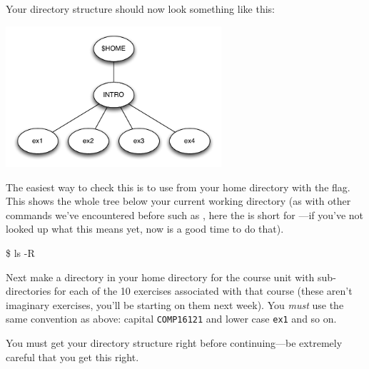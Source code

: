 Your directory structure should now look something like this:
     \begin{center}
       \includegraphics[width=0.6\textwidth]{images/intro-dir-structure}
     \end{center}

The easiest way to check this is to use 
 from your home directory with the  flag. This shows the whole tree
below your current working directory (as with other commands we've encountered before such as , here the  is short for
---if you've not looked up what this means yet, now is a good time to do that).

\begin{ttoutenv}
\$ ls -R 
\end{ttoutenv}
%

Next make a directory in your home directory for the
 course unit with sub-directories for each of the 10
exercises associated with that course (these aren't imaginary exercises, you'll be starting on them next week). You \emph{must} use the same
convention as above: capital \texttt{COMP16121} and lower case \texttt{ex1} and so on.

You must get your directory structure right before continuing---be extremely careful that you get this right.



%

